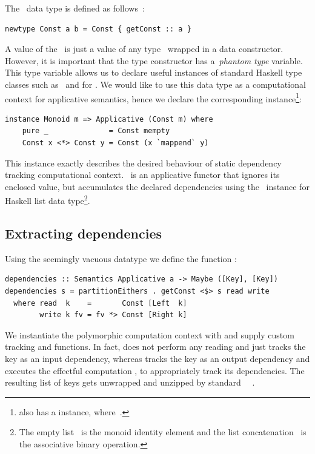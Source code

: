 The~ data type is defined as follows~\cite{Mcbride:2008:APE:1348940.1348941}:

\begin{verbatim}
newtype Const a b = Const { getConst :: a }
\end{verbatim}

\noindent
A value of the~ is just a value of any type~
wrapped in a data constructor. However, it is important that the type constructor
has a~\emph{phantom type} variable. This type variable allows us to
declare useful instances of standard Haskell type classes such as~
and  for . We would like to use this data type as a
computational context for applicative semantics, hence we declare the
corresponding instance\footnote{ also has a  instance,
where~.}:

\begin{verbatim}
instance Monoid m => Applicative (Const m) where
    pure _              = Const mempty
    Const x <*> Const y = Const (x `mappend` y)
\end{verbatim}

This instance exactly describes the desired behaviour of static dependency tracking
computational context.~ is an applicative functor that ignores
its enclosed value, but accumulates the declared dependencies using the~
instance for Haskell list data type\footnote{The empty list~\hs{[]} is the
monoid identity element and the list concatenation~\hs{(++)} is the associative
binary operation.}.

\subsection{Extracting dependencies}

Using the seemingly vacuous datatype  we define the
function :

\begin{verbatim}
dependencies :: Semantics Applicative a -> Maybe ([Key], [Key])
dependencies s = partitionEithers . getConst <$> s read write
  where read  k    =       Const [Left  k]
        write k fv = fv *> Const [Right k]
\end{verbatim}

\noindent
We instantiate the polymorphic computation context with 
and supply custom tracking  and  functions. In fact, 
does not perform any reading and just tracks the key as an input dependency,
whereas  tracks the key as an output dependency and executes the
effectful computation , to appropriately track its dependencies. The
resulting list of keys gets unwrapped and unzipped by standard
~~.

